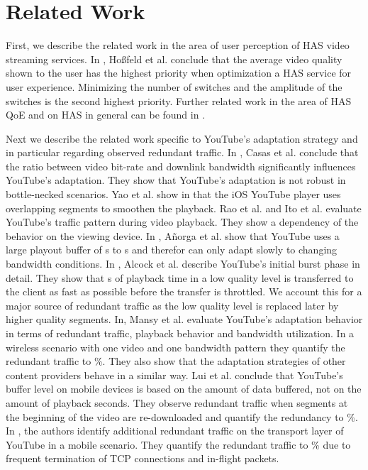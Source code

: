 
\section{Related Work}
\label{sec:relatedwork}

First, we describe the related work in the area of user perception of HAS video streaming services.
In \cite{hossfeld2015identifying, hossfeld14assessingeffect}, Hoßfeld et al. conclude that the average video quality shown to the user has the highest priority when optimization a HAS service for user experience.
Minimizing the number of switches and the amplitude of the switches is the second highest priority.
Further related work in the area of HAS QoE and on HAS in general can be found in \cite{seufert2015survey}.

Next we describe the related work specific to YouTube's adaptation strategy and in particular regarding observed redundant traffic.
In \cite{casas2012youtube}, Casas et al. conclude that the ratio between video bit-rate and downlink bandwidth significantly influences YouTube's adaptation. 
They show that YouTube's adaptation is not robust in bottle-necked scenarios.
Yao et al. show in \cite{Yao2014b} that the iOS YouTube player uses overlapping segments to smoothen the playback.
Rao et al. \cite{rao2011network} and Ito et al. \cite{ito14networklevel} evaluate YouTube's traffic pattern during video playback. They show a dependency of the behavior on the viewing device.
In \cite{Anorga2015}, A\~norga et al. show that YouTube uses a large playout buffer of \unit[13]{s} to \unit[40]{s} and therefor can only adapt slowly to changing bandwidth conditions.
In \cite{alcock11application}, Alcock et al. describe YouTube's initial burst phase in detail. They show that \unit[32]{s} of playback time in a low quality level is transferred to the client as fast as possible before the transfer is throttled. We account this for a major source of redundant traffic as the low quality level is replaced later by higher quality segments.
In, \cite{Mansy2014} Mansy et al. evaluate YouTube's adaptation behavior in terms of redundant traffic, playback behavior and bandwidth utilization. In a wireless scenario with one video and one bandwidth pattern they quantify the redundant traffic to \unit[16]{\%}. They also show that the adaptation strategies of other content providers behave in a similar way.
Lui et al. \cite{liu2013comparative} conclude that YouTube's buffer level on mobile devices is based on the amount of data buffered, not on the amount of playback seconds. They observe redundant traffic when segments at the beginning of the video are re-downloaded and quantify the redundancy to \unit[15]{\%}.
In \cite{nam2013mobile}, the authors identify additional redundant traffic on the transport layer of YouTube in a mobile scenario. They quantify the redundant traffic to \unit[35]{\%} due to frequent termination of TCP connections and in-flight packets.
